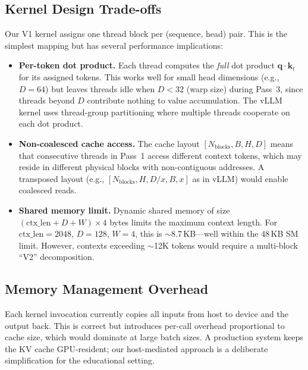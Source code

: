 \documentclass{article}
\begin{document}
\subsection{Kernel Design Trade-offs}
\label{sec:kernel_tradeoffs}

Our V1 kernel assigns one thread block per (sequence, head) pair.
This is the simplest mapping but has several performance implications:

\begin{itemize}
    \item \textbf{Per-token dot product.} Each thread computes the \emph{full} dot product $\mathbf{q} \cdot \mathbf{k}_t$ for its assigned tokens.
    This works well for small head dimensions (e.g., $D=64$) but leaves threads idle when $D < 32$ (warp size) during Pass~3, since threads beyond $D$ contribute nothing to value accumulation.
    The vLLM kernel uses thread-group partitioning where multiple threads cooperate on each dot product.

    \item \textbf{Non-coalesced cache access.} The cache layout $[N_{\text{blocks}}, B, H, D]$ means that consecutive threads in Pass~1 access different context tokens, which may reside in different physical blocks with non-contiguous addresses.
    A transposed layout (e.g., $[N_{\text{blocks}}, H, D/x, B, x]$ as in vLLM) would enable coalesced reads.

    \item \textbf{Shared memory limit.} Dynamic shared memory of size $(\text{ctx\_len} + D + W) \times 4$ bytes limits the maximum context length.
    For $\text{ctx\_len} = 2048$, $D = 128$, $W = 4$, this is $\sim$8.7\,KB---well within the 48\,KB SM limit.
    However, contexts exceeding $\sim$12K tokens would require a multi-block ``V2'' decomposition.
\end{itemize}

\subsection{Memory Management Overhead}

Each kernel invocation currently copies all inputs from host to device and the output back.
This is correct but introduces per-call overhead proportional to cache size, which would dominate at large batch sizes.
A production system keeps the KV cache GPU-resident; our host-mediated approach is a deliberate simplification for the educational setting.

\end{document}
